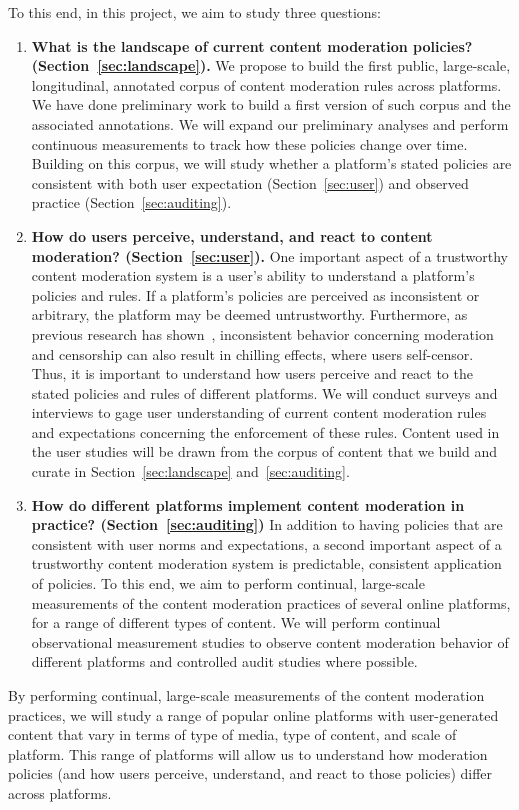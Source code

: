 To this end, in this project, we aim to study three questions: 
\begin{enumerate}
    \itemsep=-1pt
\item {\bf What is the landscape of current content moderation policies?
        (Section~\ref{sec:landscape}).} We propose to build the first
        public, large-scale, longitudinal, annotated corpus of content moderation
        rules across platforms. 
        We have done preliminary work to build a first version of such corpus and the associated annotations.
        We will expand our preliminary analyses and perform continuous measurements to track
        how these policies change over time. 
        Building on this corpus, we will study whether a platform's stated policies are consistent with both user
        expectation (Section~\ref{sec:user}) and observed practice
        (Section~\ref{sec:auditing}).
    \item {\bf How do users perceive, understand, and react to content
        moderation? (Section~\ref{sec:user}).} One important aspect of a
        trustworthy content moderation system is a user's ability to
        understand a platform's policies and rules. If a platform's policies
        are perceived as inconsistent or arbitrary, the platform may be deemed
        untrustworthy. Furthermore, as previous research has shown~\cite{fiesler_understanding_2015},
        inconsistent behavior concerning moderation and censorship can also
        result in chilling effects, where users self-censor. Thus, it is
        important to understand how users perceive and react to the stated
        policies and rules of different platforms. We will conduct surveys and interviews to gage user understanding of current content
        moderation rules and expectations concerning the enforcement of
        these rules. Content used in the user studies will be drawn
        from the corpus of content that we build and curate in
        Section~\ref{sec:landscape} and~\ref{sec:auditing}.
    \item {\bf How do different platforms implement content moderation in
        practice? (Section~\ref{sec:auditing})} In addition to having policies
        that are consistent with user norms and expectations, a second important aspect of a
        trustworthy content moderation system is predictable, consistent
        application of policies. To this end, we aim to perform continual,
        large-scale measurements of the content moderation practices of
        several online platforms, for a range of different types
        of content. We will perform 
        continual observational measurement studies to observe content moderation behavior
        of different platforms and controlled audit studies where possible.
\end{enumerate}
\noindent
By performing continual, large-scale measurements of the content
moderation practices, we will study a range of popular online
platforms with user-generated content that vary in terms of type of
media, type of content, and scale of platform. This range of platforms
will allow us to understand how moderation policies (and how users perceive,
understand, and react to those policies) differ across platforms. 
